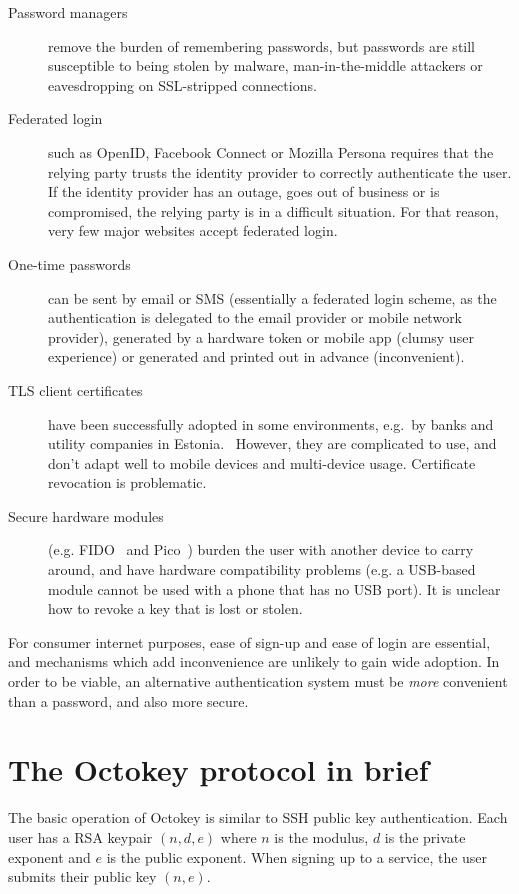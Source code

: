 \documentclass{acm_proc_article-sp}
\begin{document}
\begin{description}
\item[Password managers] remove the burden of remembering passwords, but passwords are still
susceptible to being stolen by malware, man-in-the-middle attackers or eavesdropping on SSL-stripped
connections.
\item[Federated login] such as OpenID, Facebook Connect or Mozilla Persona requires that the relying
party trusts the identity provider to correctly authenticate the user. If the identity provider has
an outage, goes out of business or is compromised, the relying party is in a difficult situation.
For that reason, very few major websites accept federated login.
\item[One-time passwords] can be sent by email or SMS (essentially a federated login scheme, as the
authentication is delegated to the email provider or mobile network provider), generated by a
hardware token or mobile app (clumsy user experience) or generated and printed out in advance
(inconvenient).
\item[TLS client certificates] have been successfully adopted in some environments, e.g.\ by banks
and utility companies in Estonia.~\cite{Parsovs14} However, they are complicated to use, and don't
adapt well to mobile devices and multi-device usage. Certificate revocation is problematic.
\item[Secure hardware modules] (e.g. FIDO~\cite{FIDOOverview} and Pico~\cite{Stajano11}) burden the
user with another device to carry around, and have hardware compatibility problems (e.g. a USB-based
module cannot be used with a phone that has no USB port). It is unclear how to revoke a key that is
lost or stolen.
\end{description}

For consumer internet purposes, ease of sign-up and ease of login are essential, and mechanisms
which add inconvenience are unlikely to gain wide adoption. In order to be viable, an alternative
authentication system must be \emph{more} convenient than a password, and also more secure.

\section{The Octokey protocol in brief}

The basic operation of Octokey is similar to SSH public key authentication. Each user has a RSA
keypair $(n, d, e)$ where $n$ is the modulus, $d$ is the private exponent and $e$ is the public
exponent. When signing up to a service, the user submits their public key $(n, e)$.
\end{document}

